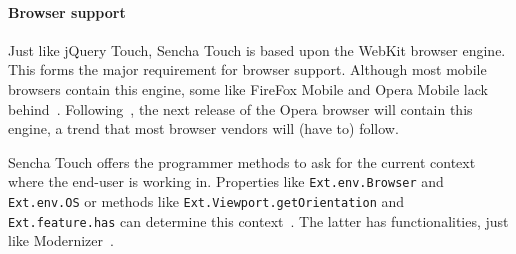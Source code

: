 \documentclass[a4paper]{article}
\newcommand{\term}[1]{\emph{#1}}
\newcommand{\code}[1]{\texttt{#1}}
\begin{document}

% 
% 

\paragraph{Browser support}
Just like jQuery Touch,  Sencha Touch is based upon the WebKit browser engine.  This forms the major requirement for browser support.  Although most mobile browsers contain this engine,  some like FireFox Mobile and Opera Mobile lack behind~\cite{JohnEClark2012}.  Following~\cite{Wokke2013}, the next release of the Opera browser will contain this engine,  a trend that most browser vendors will (have to) follow.

Sencha Touch offers the programmer methods to ask for the current context where the end-user is working in.  Properties like \code{Ext.env.Browser} and \code{Ext.env.OS} or methods like \code{Ext.Viewport.getOrientation} and \code{Ext.feature.has} can determine this context~\cite{JohnEClark2012}.  The latter has functionalities,  just like Modernizer~\cite{Modernizr2012}.  
\end{document}
